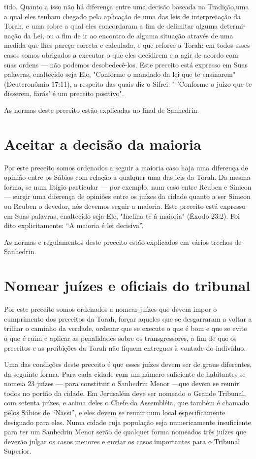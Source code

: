 tido. Quanto a isso não há diferença entre uma decisão baseada na
Tradição,uma a qual eles tenham chegado pela aplicação de uma das leis
de interpretação da Torah, e uma sobre a qual eles concordaram a fim de
delimitar alguma determi­nação da Lei, ou a fim de ir ao encontro de
alguma situação através de uma medida que lhes pareça correta e
calculada, e que reforce a Torah: em todos esses casos somos obrigados a
executar o que eles decidirem e a agir de acordo com suas ordens --- não
podemos desobedecê-los. Este preceito está expresso em Suas palavras,
enaltecido seja Ele, "Conforme o mandado da lei que te ensi­narem"
(Deuteronômio 17:11), a respeito das quais diz o Sifrei: " 'Conforme o
juízo que te disserem, farás' é um preceito positivo".


As normas deste preceito estão explicadas no final de Sanhedrin.


\section{Aceitar a decisão da maioria}

Por este preceito somos ordenados a seguir a maioria caso haja uma
diferença de opinião entre os Sábios com relação a qualquer uma das leis
da Torah. Da mesma forma, se num litígio particular --- por exemplo, num
caso entre Reuben e Simeon --- surgir uma diferença de opiniões entre os
juízes da cidade quanto a ser Simeon ou Reuben o devedor, nós devemos
seguir a maio­ria. Este preceito está expresso em Suas palavras,
enaltecido seja Ele, "Inclina-te à maioria" (Êxodo 23:2). Foi dito
explicitamente: ``A maioria é lei decisiva''.

As normas e regulamentos deste preceito estão explicados em vá­rios
trechos de Sanhedrin.

\section{Nomear juízes e oficiais do tribunal}

Por este preceito somos ordenados a nomear juízes que devem im­por o
cumprimento dos preceitos da Torah, forçar aqueles que se desgarraram a
voltar a trilhar o caminho da verdade, ordenar que se execute o que é
bom e que se evite o que é ruim e aplicar as penalidades sobre os
transgressores, a fim de que os preceitos e as proibições da Torah não
fiquem entregues à von­tade do indivíduo.

Uma das condições deste preceito é que esses juízes devem ser de graus
diferentes, da seguinte forma. Para cada cidade com um número
suficien­te de habitantes se nomeia 23 juízes --- para constituir o
Sanhedrin Menor ---que devem se reunir todos no portão da cidade. Em
Jerusalém deve ser nomea­do o Grande Tribunal, com setenta juízes, e
acima deles o Chefe da Assembléia, que também é chamado pelos Sábios de
``Nassi'', e eles devem se reunir num local especificamente designado para
eles. Numa cidade cuja população seja nu­mericamente insuficiente para
ter um Sanhedrin Menor serão de qualquer for­ma nomeados três juízes que
deverão julgar os casos menores e enviar os casos importantes para o
Tribunal Superior.

